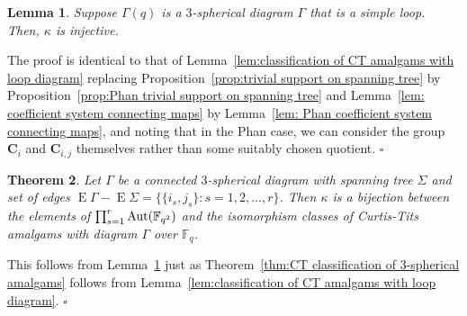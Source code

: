 \documentclass[12pt]{amsart}
\newtheorem{theorem}{Theorem}[section]
\newtheorem{lemma}[theorem]{Lemma}
\theoremstyle{definition}
\newcommand{\bpf}{\noindent{\bf Proof}\hspace{7pt}}
\newcommand{\epf}{\qed}
\newcommand{\ble}{\begin{lemma}}
\newcommand{\ele}{\end{lemma}}
\newcommand{\bth}{\begin{theorem}}
\renewcommand{\eth}{\end{theorem}}
\newcommand{\Aut}{\mathop{\rm Aut}\nolimits}
\newcommand{\FF}{{\mathbb F}}
\renewcommand{\qed}{\hfill $\square$}
\newcommand{\amgrpC}{{\mathbf{C}}}
\DeclareMathOperator{\edg}{E}
\newcommand{\liediag}{\Gamma}
\begin{document}
\ble\label{lem:classification of  P amalgams with loop diagram}
Suppose $\liediag(q)$ is a 
$3$-spherical diagram $\liediag$ that is a simple loop. 
Then, $\kappa$ is injective.
\ele


\bpf
The proof is identical to that of Lemma~\ref{lem:classification of  CT amalgams with loop diagram} replacing Proposition~\ref{prop:trivial support on spanning tree} by Proposition~\ref{prop:Phan trivial support on spanning tree}  and Lemma~\ref{lem: coefficient system connecting maps} by Lemma~\ref{lem: Phan coefficient system connecting maps}, and noting that in the Phan case, we can consider the group $\amgrpC_i$ and $\amgrpC_{i,j}$ themselves rather than some suitably chosen quotient.
\epf

\bth\label{thm:P classification of 3-spherical amalgams}
Let  $\liediag$ be a connected $3$-spherical diagram with spanning tree $\Sigma$ and set of edges
 $\edg\liediag-\edg\Sigma=\{\{i_s,j_s\}\colon s=1,2,\ldots,r\}$.
Then $\kappa$ is a bijection between the elements of $\prod_{s=1}^r \Aut(\FF_{q^2})$ and the isomorphism classes of  Curtis-Tits amalgams with diagram $\liediag$ over $\FF_q$.
\eth
\bpf
This follows from Lemma~\ref{lem:classification of  P amalgams with loop diagram}
just as Theorem~\ref{thm:CT classification of 3-spherical amalgams}
follows from Lemma~\ref{lem:classification of  CT amalgams with loop diagram}.
\epf
\end{document}
